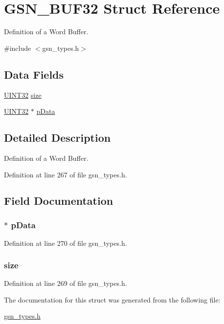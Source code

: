 \hypertarget{a00031}{
\section{GSN\_\-BUF32 Struct Reference}
\label{a00031}
}


Definition of a Word Buffer.  




{\ttfamily \#include $<$gsn\_\-types.h$>$}

\subsection*{Data Fields}
\begin{DoxyCompactItemize}
\item 
\hyperlink{a00660_gae1e6edbbc26d6fbc71a90190d0266018}{UINT32} \hyperlink{a00031_a6d4bac4be8d2f0ee400eb63ac2204aac}{size}
\item 
\hyperlink{a00660_gae1e6edbbc26d6fbc71a90190d0266018}{UINT32} $\ast$ \hyperlink{a00031_ab8d04b12f85e135b4dd950932e544a7a}{pData}
\end{DoxyCompactItemize}


\subsection{Detailed Description}
Definition of a Word Buffer. 

Definition at line 267 of file gsn\_\-types.h.



\subsection{Field Documentation}
\hypertarget{a00031_ab8d04b12f85e135b4dd950932e544a7a}{
\subsubsection[{pData}]{$\ast$ {\bf pData}}}
\label{a00031_ab8d04b12f85e135b4dd950932e544a7a}


Definition at line 270 of file gsn\_\-types.h.

\hypertarget{a00031_a6d4bac4be8d2f0ee400eb63ac2204aac}{
\subsubsection[{size}]{ {\bf size}}}
\label{a00031_a6d4bac4be8d2f0ee400eb63ac2204aac}


Definition at line 269 of file gsn\_\-types.h.



The documentation for this struct was generated from the following file:\begin{DoxyCompactItemize}
\item 
\hyperlink{a00599}{gsn\_\-types.h}\end{DoxyCompactItemize}
